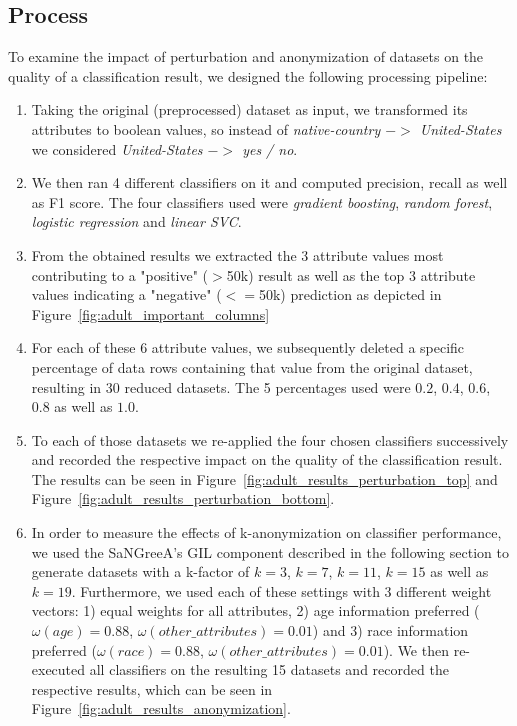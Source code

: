 \documentclass{llncs}
\begin{document}
\subsection{Process}
\label{ssect:process}

To examine the impact of perturbation and anonymization of datasets on the quality of a classification result, we designed the following processing pipeline:


\begin{enumerate}
	\item Taking the original (preprocessed) dataset as input, we transformed its attributes to boolean values, so instead of \textit{native-country $->$ United-States} we considered \textit{United-States $->$ yes / no}.
	\item We then ran 4 different classifiers on it and computed precision, recall as well as F1 score. The four classifiers used were \textit{gradient boosting}, \textit{random forest}, \textit{logistic regression} and \textit{linear SVC}.
	\item From the obtained results we extracted the 3 attribute values most contributing to a "positive" ($>$50k) result as well as the top 3 attribute values indicating a "negative" ($<=$50k) prediction as depicted in Figure~\ref{fig:adult_important_columns}
	\item For each of these 6 attribute values, we subsequently deleted a specific percentage of data rows containing that value from the original dataset, resulting in 30 reduced datasets. The 5 percentages used were $0.2$, $0.4$, $0.6$, $0.8$ as well as $1.0$.
	\item To each of those datasets we re-applied the four chosen classifiers successively and recorded the respective impact on the quality of the classification result. The results can be seen in Figure~\ref{fig:adult_results_perturbation_top} and Figure~\ref{fig:adult_results_perturbation_bottom}.
	\item In order to measure the effects of k-anonymization on classifier performance, we used the SaNGreeA's GIL component described in the following section to generate datasets with a k-factor of $k=3$, $k=7$, $k=11$, $k=15$ as well as $k=19$. Furthermore, we used each of these settings with 3 different weight vectors: 1) equal weights for all attributes, 2) age information preferred ($\omega(age)=0.88$, $\omega(other\_attributes)=0.01$) and 3) race information preferred ($\omega(race)=0.88$, $\omega(other\_attributes)=0.01$). We then re-executed all classifiers on the resulting 15 datasets and recorded the respective results, which can be seen in Figure~\ref{fig:adult_results_anonymization}.
\end{enumerate}
\end{document}
